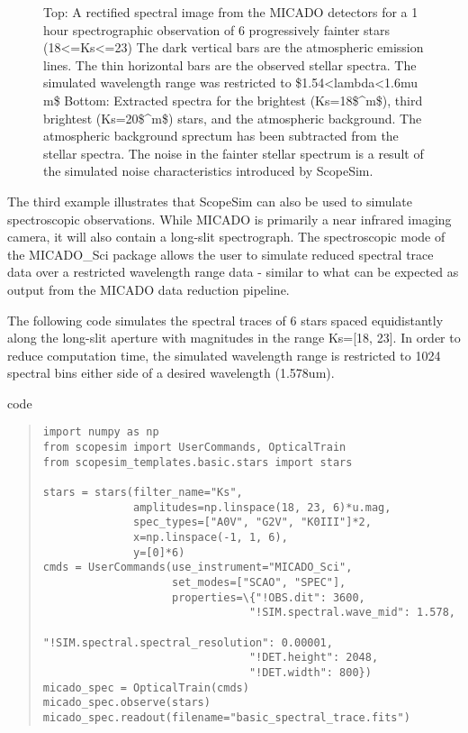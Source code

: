 \begin{figure}
\noindent{}\label{fig-example-3-spectra}

\caption{Top: A rectified spectral image from the MICADO detectors for a 1 hour spectrographic observation of 6 progressively fainter stars (18<=Ks<=23)
The dark vertical bars are the atmospheric emission lines.
The thin horizontal bars are the observed stellar spectra.
The simulated wavelength range was restricted to \$1.54<lambda<1.6mu m\$
Bottom: Extracted spectra for the brightest (Ks=18\$\textasciicircum{}m\$), third brightest (Ks=20\$\textasciicircum{}m\$) stars, and the atmospheric background.
The atmospheric background sprectum has been subtracted from the stellar spectra.
The noise in the fainter stellar spectrum is a result of the simulated noise characteristics introduced by ScopeSim.}
\end{figure}

The third example illustrates that ScopeSim can also be used to simulate spectroscopic observations.
While MICADO is primarily a near infrared imaging camera, it will also contain a long-slit spectrograph.
The spectroscopic mode of the MICADO\_Sci package allows the user to simulate reduced spectral trace data over a restricted wavelength range data - similar to what can be expected as output from the MICADO data reduction pipeline.

The following code simulates the spectral traces of 6 stars spaced equidistantly along the long-slit aperture with magnitudes in the range Ks={[}18, 23{]}.
In order to reduce computation time, the simulated wavelength range is restricted to 1024 spectral bins either side of a desired wavelength (1.578um).

\label{code-example-3-spectra}
\begin{DUclass}{code}
\begin{quote}
\begin{alltt}
\begin{lstlisting}[frame=single]
import numpy as np
from scopesim import UserCommands, OpticalTrain
from scopesim_templates.basic.stars import stars

stars = stars(filter_name="Ks",
              amplitudes=np.linspace(18, 23, 6)*u.mag,
              spec_types=["A0V", "G2V", "K0III"]*2,
              x=np.linspace(-1, 1, 6),
              y=[0]*6)
cmds = UserCommands(use_instrument="MICADO_Sci",
                    set_modes=["SCAO", "SPEC"],
                    properties=\{"!OBS.dit": 3600,
                                "!SIM.spectral.wave_mid": 1.578,
                                "!SIM.spectral.spectral_resolution": 0.00001,
                                "!DET.height": 2048,
                                "!DET.width": 800})
micado_spec = OpticalTrain(cmds)
micado_spec.observe(stars)
micado_spec.readout(filename="basic_spectral_trace.fits")
\end{lstlisting}
\end{alltt}
\end{quote}
\end{DUclass}

